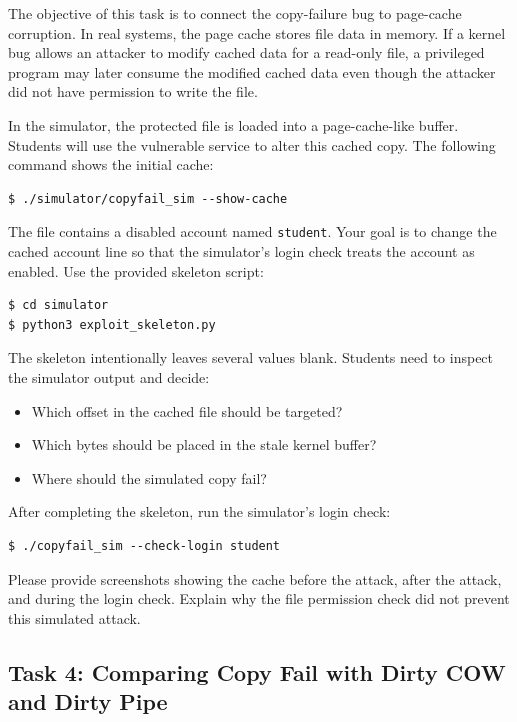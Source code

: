 The objective of this task is to connect the copy-failure bug to page-cache
corruption. In real systems, the page cache stores file data in memory. If a
kernel bug allows an attacker to modify cached data for a read-only file, a
privileged program may later consume the modified cached data even though the
attacker did not have permission to write the file.

In the simulator, the protected file is loaded into a page-cache-like buffer.
Students will use the vulnerable service to alter this cached copy. The
following command shows the initial cache:

\begin{lstlisting}
$ ./simulator/copyfail_sim --show-cache
\end{lstlisting}

The file contains a disabled account named \texttt{student}. Your goal is to
change the cached account line so that the simulator's login check treats the
account as enabled. Use the provided skeleton script:

\begin{lstlisting}
$ cd simulator
$ python3 exploit_skeleton.py
\end{lstlisting}

The skeleton intentionally leaves several values blank. Students need to inspect
the simulator output and decide:

\begin{itemize}[noitemsep]
\item Which offset in the cached file should be targeted?
\item Which bytes should be placed in the stale kernel buffer?
\item Where should the simulated copy fail?
\end{itemize}

After completing the skeleton, run the simulator's login check:

\begin{lstlisting}
$ ./copyfail_sim --check-login student
\end{lstlisting}

Please provide screenshots showing the cache before the attack, after the
attack, and during the login check. Explain why the file permission check did
not prevent this simulated attack.


\subsection{Task 4: Comparing Copy Fail with Dirty COW and Dirty Pipe}


